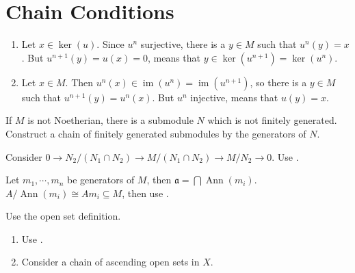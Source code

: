 \section{Chain Conditions}

\begin{exercise}\label{ex6.1}
	\begin{enumerate}[label=(\roman*),ref=\theexercise(\roman*)]
		\item Let $x\in\ker(u)$. Since $u^n$ surjective, there is a $y\in M$ such that $u^n(y)=x$. But $u^{n+1}(y)=u(x)=0$, means that $y\in\ker\left(u^{n+1}\right)=\ker\left(u^n\right)$.
		\item Let $x\in M$. Then $u^n(x)\in\operatorname{im}\left(u^n\right)=\operatorname{im}\left(u^{n+1}\right)$, so there is a $y\in M$ such that $u^{n+1}(y)=u^n(x)$. But $u^n$ injective, means that $u(y)=x$.
	\end{enumerate}
\end{exercise}

\begin{exercise}\label{ex6.2}
	If $M$ is not Noetherian, there is a submodule $N$ which is not finitely generated. Construct a chain of finitely generated submodules by the generators of $N$.
\end{exercise}

\begin{exercise}\label{ex6.3}
	Consider $0\rightarrow N_2/\left(N_1\cap N_2\right)\rightarrow M/\left(N_1\cap N_2\right)\rightarrow M/N_2\rightarrow0$. Use .
\end{exercise}

\begin{exercise}\label{ex6.4}
	Let $m_1,\cdots,m_n$ be generators of $M$, then $\mathfrak{a}=\bigcap\operatorname{Ann}\left(m_i\right)$. $A/\operatorname{Ann}\left(m_i\right)\cong Am_i\subseteq M$, then use .
\end{exercise}

\begin{exercise}\label{ex6.5}
	Use the open set definition.
\end{exercise}

\begin{exercise}\label{ex6.6}
	\begin{enumerate}
		\item[(i) $\Rightarrow$ (iii)] Use .
		\item[(ii) $\Rightarrow$ (i)] Consider a chain of ascending open sets in $X$.
	\end{enumerate}
\end{exercise}

